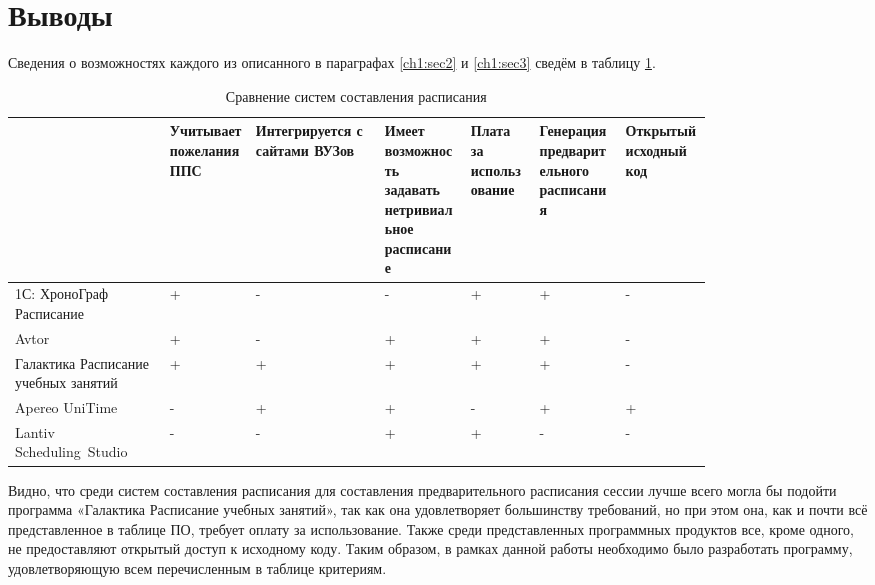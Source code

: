 \section{Выводы} \label{ch1:conclusion}
Сведения о возможностях каждого из описанного в параграфах	\ref{ch1:sec2} и \ref{ch1:sec3} сведём в таблицу \ref{tab:1.4.1}.
\begin{table} [htbp]
	\centering\small
	\caption{Сравнение систем составления расписания}%
	\label{tab:1.4.1}	
	\begin{tabular}{|p{0.18\linewidth}|p{0.1\linewidth}|p{0.15\linewidth}|p{0.1\linewidth}|p{0.08\linewidth}|p{0.1\linewidth}|p{0.1\linewidth}|}
		\hline
		&Учитывает пожелания ППС&Интегрируется с сайтами ВУЗов&Имеет возможность задавать нетривиальное расписание&Плата за использование&Генерация предварительного расписания&Открытый исходный код\\
		\hline
		1С: ХроноГраф Расписание&+&-&-&+&+&-\\ \hline
		Avtor&+&-&+&+&+&-\\ \hline
		Галактика Расписание учебных занятий&+&+&+&+&+&-\\ \hline
		Apereo UniTime&-&+&+&-&+&+\\ \hline
		Lantiv Scheduling Studio&-&-&+&+&-&-\\ \hline	
	\end{tabular}
\end{table}

Видно, что среди систем составления расписания для составления предварительного расписания сессии лучше всего могла бы подойти программа «Галактика Расписание учебных занятий», так как она удовлетворяет большинству требований, но при этом она, как и почти всё представленное в таблице ПО, требует оплату за использование. Также среди представленных программных продуктов все, кроме одного, не предоставляют открытый доступ к исходному коду. 
Таким образом, в рамках данной работы необходимо было разработать программу, удовлетворяющую всем перечисленным в таблице критериям.


